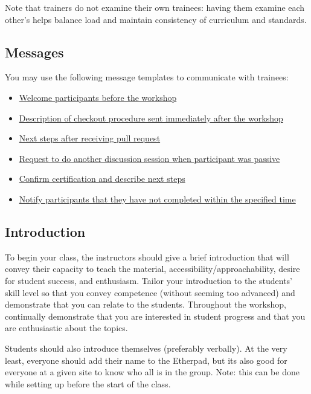 Note that trainers do not examine their own trainees: having them
examine each other's helps balance load and maintain consistency of
curriculum and standards.

\subsection{Messages}\label{messages}

You may use the following message templates to communicate with
trainees:

\begin{itemize}
\itemsep1pt\parskip0pt
\item
  \href{\{\{\%20page.root\%20\}\}/files/messages/welcome.txt}{Welcome
  participants before the workshop}
\item
  \href{\{\{\%20page.root\%20\}\}/files/messages/checkout.txt}{Description
  of checkout procedure sent immediately after the workshop}
\item
  \href{\{\{\%20page.root\%20\}\}/files/messages/after-pr.txt}{Next
  steps after receiving pull request}
\item
  \href{\{\{\%20page.root\%20\}\}/files/messages/passive-discussion.txt}{Request
  to do another discussion session when participant was passive}
\item
  \href{\{\{\%20page.root\%20\}\}/files/messages/completion.txt}{Confirm
  certification and describe next steps}
\item
  \href{\{\{\%20page.root\%20\}\}/files/messages/expiry.txt}{Notify
  participants that they have not completed within the specified time}
\end{itemize}

\subsection{Introduction}\label{introduction}

To begin your class, the instructors should give a brief introduction
that will convey their capacity to teach the material,
accessibility/approachability, desire for student success, and
enthusiasm. Tailor your introduction to the students' skill level so
that you convey competence (without seeming too advanced) and
demonstrate that you can relate to the students. Throughout the
workshop, continually demonstrate that you are interested in student
progress and that you are enthusiastic about the topics.

Students should also introduce themselves (preferably verbally). At the
very least, everyone should add their name to the Etherpad, but its also
good for everyone at a given site to know who all is in the group. Note:
this can be done while setting up before the start of the class.

